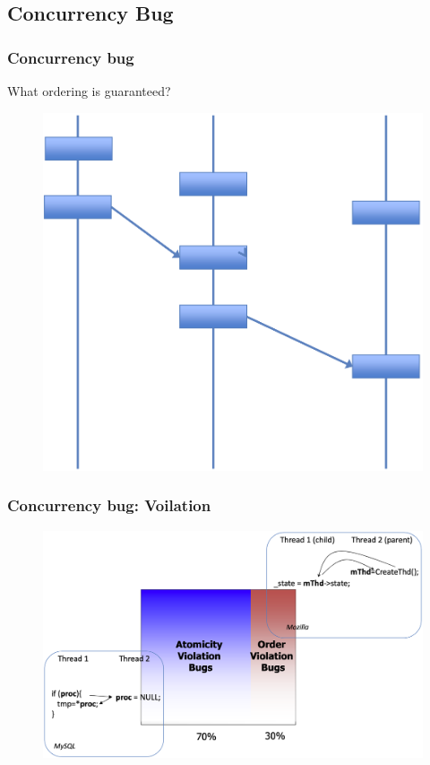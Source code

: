 \subsection{Concurrency Bug} %
\begin{frame}[fragile]
    \frametitle{Concurrency bug}

What ordering is guaranteed?

    \begin{figure}
    \includegraphics[width=0.4\linewidth]{figs/ordering.png}
    \end{figure}
\end{frame}
% 
% 
% 
% 
% 
% 
\begin{frame}[fragile]
    \frametitle{Concurrency bug: Voilation}
    \begin{figure}
    \includegraphics[width=0.4\linewidth]{figs/root-cause-patterns-violation.png}
    \end{figure}
\end{frame}
